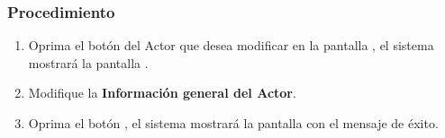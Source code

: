 \subsubsection{Procedimiento}
\begin{enumerate}
	\item Oprima el botón \btnEditar del Actor que desea modificar en la pantalla , el sistema mostrará la pantalla . 

	
	\item Modifique la \textbf{Información general del Actor}.
	
	\item Oprima el botón , el sistema mostrará la pantalla  con el mensaje de éxito.
\end{enumerate}


